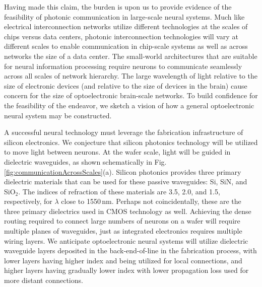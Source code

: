 \documentclass[twocolumn]{article}
\begin{document}
Having made this claim, the burden is upon us to provide evidence of the feasibility of photonic communication in large-scale neural systems. Much like electrical interconnection networks utilize different technologies at the scales of chips versus data centers, photonic interconnection technologies will vary at different scales to enable communication in chip-scale systems as well as across networks the size of a data center. The small-world architectures that are suitable for neural information processing require neurons to communicate seamlessly across all scales of network hierarchy. The large wavelength of light relative to the size of electronic devices (and relative to the size of devices in the brain) cause concern for the size of optoelectronic brain-scale networks. To build confidence for the feasibility of the endeavor, we sketch a vision of how a general optoelectronic neural system may be constructed.

A successful neural technology must leverage the fabrication infrastructure of silicon electronics. We conjecture that silicon photonics technology will be utilized to move light between neurons. At the wafer scale, light will be guided in dielectric waveguides, as shown schematically in Fig.\,\ref{fig:communicationAcrossScales}(a). Silicon photonics provides three primary dielectric materials that can be used for these passive waveguides: Si, SiN, and SiO$_2$. The indices of refraction of these materials are 3.5, 2.0, and 1.5, respectively, for $\lambda$ close to 1550\,nm. Perhaps not coincidentally, these are the three primary dielectrics used in CMOS technology as well. Achieving the dense routing required to connect large numbers of neurons on a wafer will require multiple planes of waveguides, just as integrated electronics requires multiple wiring layers. We anticipate optoelectronic neural systems will utilize dielectric waveguide layers deposited in the back-end-of-line in the fabrication process, with lower layers having higher index and being utilized for local connections, and higher layers having gradually lower index with lower propagation loss used for more distant connections. 
\end{document}
